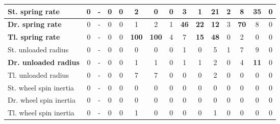 \begin{table}[H]
\begin{tabular}{|l|c|c|c|c|c|c|c|c|c|c|c|c|c|c|}
\hline
\textcolor[rgb]{0.000, 0.620, 0.451}{\textbf{St. spring rate}} & 0 & - & 0 & 0 & 2 & 0 & 0 & 3 & 1 & \textbf{21} & 2 & 8 & \textcolor[rgb]{0.000, 0.620, 0.451}{\textbf{35}} & 0 \\
\hline
\textcolor[rgb]{0.000, 0.447, 0.698}{\textbf{Dr. spring rate}} & 0 & - & 0 & 0 & 1 & 2 & 1 & \textcolor[rgb]{0.000, 0.620, 0.451}{\textbf{46}} & \textbf{22} & \textbf{12} & 3 & \textcolor[rgb]{0.000, 0.447, 0.698}{\textbf{70}} & 8 & 0 \\
\hline
\textcolor[rgb]{0.851, 0.373, 0.008}{\textbf{Tl. spring rate}} & 0 & - & 0 & 0 & \textcolor[rgb]{0.835, 0.369, 0.000}{\textbf{100}} & \textcolor[rgb]{0.835, 0.369, 0.000}{\textbf{100}} & 4 & 7 & \textbf{15} & \textcolor[rgb]{0.000, 0.620, 0.451}{\textbf{48}} & 0 & 2 & 0 & 0 \\
\hline
St. unloaded radius & 0 & - & 0 & 0 & 0 & 0 & 0 & 1 & 0 & 5 & 1 & 7 & 9 & 0 \\
\hline
\textbf{Dr. unloaded radius} & 0 & - & 0 & 0 & 1 & 1 & 0 & 1 & 1 & 2 & 0 & 4 & \textbf{11} & 0 \\
\hline
Tl. unloaded radius & 0 & - & 0 & 0 & 7 & 7 & 0 & 0 & 0 & 2 & 0 & 0 & 0 & 0 \\
\hline
St. wheel spin inertia & 0 & - & 0 & 0 & 0 & 0 & 0 & 0 & 0 & 0 & 0 & 0 & 0 & 0 \\
\hline
Dr. wheel spin inertia & 0 & - & 0 & 0 & 0 & 0 & 0 & 0 & 0 & 0 & 0 & 0 & 0 & 0 \\
\hline
Tl. wheel spin inertia & 0 & - & 0 & 0 & 1 & 0 & 0 & 0 & 0 & 1 & 0 & 0 & 0 & 0 \\
\hline

\end{tabular}%
\end{table}%

